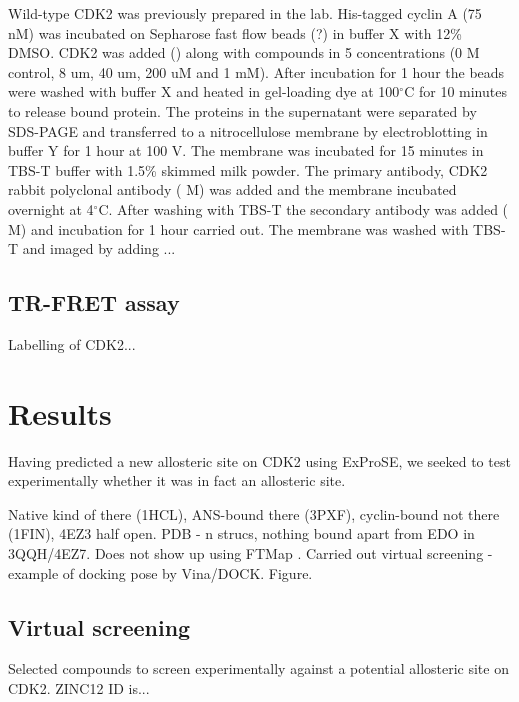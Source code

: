 Wild-type CDK2 was previously prepared in the lab.
His-tagged cyclin A (75 nM) was incubated on Sepharose fast flow beads (?) in buffer X with 12\% DMSO.
CDK2 was added () along with compounds in 5 concentrations (0 M control, 8 um, 40 um, 200 uM and 1 mM).
After incubation for 1 hour the beads were washed with buffer X and heated in gel-loading dye at 100$^{\circ}$C for 10 minutes to release bound protein.
The proteins in the supernatant were separated by SDS-PAGE and transferred to a nitrocellulose membrane by electroblotting in buffer Y for 1 hour at 100 V.
The membrane was incubated for 15 minutes in TBS-T buffer with 1.5\% skimmed milk powder.
The primary antibody, CDK2 rabbit polyclonal antibody ( M) was added and the membrane incubated overnight at 4$^{\circ}$C.
After washing with TBS-T the secondary antibody was added ( M) and incubation for 1 hour carried out.
The membrane was washed with TBS-T and imaged by adding ...


\subsection{TR-FRET assay}

Labelling of CDK2...


\section{Results}

Having predicted a new allosteric site on CDK2 using ExProSE, we seeked to test experimentally whether it was in fact an allosteric site.

Native kind of there (1HCL), ANS-bound there (3PXF), cyclin-bound not there (1FIN), 4EZ3 half open.
PDB - n strucs, nothing bound apart from EDO in 3QQH/4EZ7.
Does not show up using FTMap \cite{Kozakov2015}.
Carried out virtual screening - example of docking pose by Vina/DOCK.
Figure.


\subsection{Virtual screening}


\begin{table}
\centering

\begin{small}

\end{small}

\caption{Selected compounds to screen experimentally against a potential allosteric site on CDK2.
ZINC12 ID is...}

\label{tab:enamine_compounds}
\end{table}


